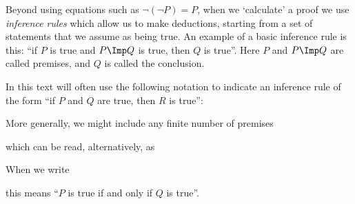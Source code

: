 Beyond using equations such as $\lnot (\lnot P) = P$, when we `calculate' a proof we use \emph{inference rules} which allow us to make deductions, starting from a set of statements that we assume as being true. An example of a basic inference rule is this: ``if $P$ is true and $P \Imp Q$ is true, then $Q$ is true''. Here $P$ and $P \Imp Q$ are called premises, and $Q$ is called the conclusion. 

In this text will often use the following notation to indicate an inference rule of the form ``if $P$ and $Q$ are true, then $R$ is true'': 


More generally, we might include any finite number of premises


which can be read, alternatively, as 
 


When we write 


this means ``$P$ is true if and only if $Q$ is true''. 







